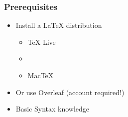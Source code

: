 \begin{frame}
    \frametitle{Prerequisites}
    \begin{itemize}
        \item Install a \LaTeX{} distribution
        \begin{itemize}
            \item \TeX{} Live %
            \item {}
            \item Mac\TeX{}
        \end{itemize}
        \item Or use Overleaf (account required!)
        \item Basic Syntax knowledge
    \end{itemize}
\end{frame}

